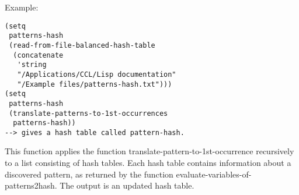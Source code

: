 \vspace{0.5cm}
\noindent Example:
\begin{verbatim}
(setq
 patterns-hash
 (read-from-file-balanced-hash-table
  (concatenate
   'string
   "/Applications/CCL/Lisp documentation"
   "/Example files/patterns-hash.txt")))
(setq
 patterns-hash
 (translate-patterns-to-1st-occurrences
  patterns-hash))
--> gives a hash table called pattern-hash.
\end{verbatim}

\noindent This function applies the function
translate-pattern-to-1st-occurrence recursively to a
list consisting of hash tables. Each hash table
contains information about a discovered pattern, as
returned by the function evaluate-variables-of-
patterns2hash. The output is an updated hash table.

















